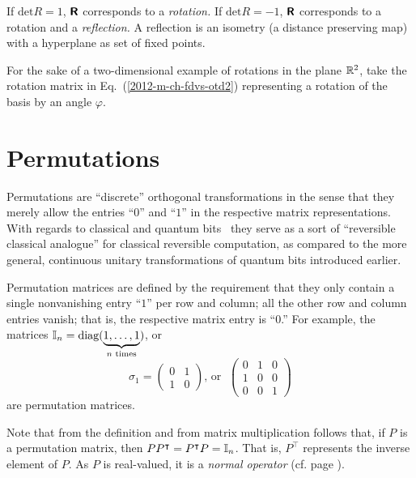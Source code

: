 If $\textrm{det} R=1$, $\textsf{\textbf{R}}$ corresponds to a {\em rotation.}
If $\textrm{det} R=-1$, $\textsf{\textbf{R}}$ corresponds to a rotation and a {\em reflection.}
A reflection is an isometry (a distance preserving map) with a hyperplane as set of fixed points.



{\color{blue}
\bexample
For the sake of a two-dimensional  example of rotations in the plane ${\Bbb R}^2$,
take the rotation matrix in Eq.~(\ref{2012-m-ch-fdvs-otd2})
representing a rotation of the basis by an angle $\varphi$.

\eexample
}


\section{Permutations}
\label{2018-permutation}

Permutations are ``discrete'' orthogonal transformations in the sense that
they merely allow the entries ``$0$'' and ``$1$'' in the respective matrix representations.
With regards to classical and quantum bits~\cite{mermin-04,mermin-07}
they serve as a sort of ``reversible classical analogue'' for classical reversible computation,
as compared to the more general, continuous unitary transformations of quantum bits introduced earlier.

Permutation matrices are defined by the requirement that they only contain a single nonvanishing entry ``$1$'' per row and column;
all the other row and column entries vanish; that is, the respective matrix entry is ``$0$.''
For example, the matrices ${\Bbb I}_n=\textrm{diag}(\underbrace{1,\ldots ,1}_{n \textrm{ times}})$,
or
$$
\sigma_1=
\begin{pmatrix}
0&1\\
1&0
\end{pmatrix}
\textrm{, or }\;
\begin{pmatrix}
0&1&0\\
1&0&0\\
0&0&1
\end{pmatrix}
$$
are permutation matrices.

Note that from the definition and from matrix multiplication follows that,
if $P$ is a permutation matrix, then $PP^\intercal =P^\intercal  P={\Bbb I}_n$.
That is, $P^\intercal $ represents the inverse element of $P$.
As $P$ is real-valued, it is a {\em normal operator} (cf. page \pageref{2014-m-fdvs-normality}).


